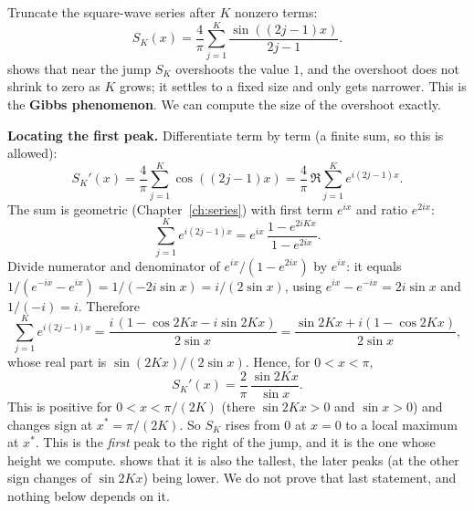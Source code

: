 Truncate the square-wave series after $K$ nonzero terms:
\begin{equation}
S_K(x)=\frac4\pi\sum_{j=1}^{K}\frac{\sin((2j-1)x)}{2j-1}.
\end{equation}
 shows that near the jump $S_K$ overshoots the value $1$, and the overshoot does not shrink to zero as $K$ grows; it settles to a fixed size and only gets narrower. This is the \textbf{Gibbs phenomenon}. We can compute the size of the overshoot exactly.

\textbf{Locating the first peak.} Differentiate term by term (a finite sum, so this is allowed):
\begin{equation}
S_K'(x)=\frac4\pi\sum_{j=1}^K\cos((2j-1)x)=\frac4\pi\,\Re\sum_{j=1}^K e^{i(2j-1)x}.
\end{equation}
The sum is geometric (Chapter~\ref{ch:series}) with first term $e^{ix}$ and ratio $e^{2ix}$:
\begin{equation}
\sum_{j=1}^K e^{i(2j-1)x}=e^{ix}\,\frac{1-e^{2iKx}}{1-e^{2ix}} .
\end{equation}
Divide numerator and denominator of $e^{ix}/(1-e^{2ix})$ by $e^{ix}$: it equals $1/(e^{-ix}-e^{ix})=1/(-2i\sin x)=i/(2\sin x)$, using $e^{ix}-e^{-ix}=2i\sin x$ and $1/(-i)=i$. Therefore
\begin{equation}
\sum_{j=1}^K e^{i(2j-1)x}=\frac{i\,(1-\cos2Kx-i\sin 2Kx)}{2\sin x}=\frac{\sin2Kx+i(1-\cos2Kx)}{2\sin x},
\end{equation}
whose real part is $\sin(2Kx)/(2\sin x)$. Hence, for $0<x<\pi$,
\begin{equation}
S_K'(x)=\frac{2}{\pi}\,\frac{\sin 2Kx}{\sin x}.
\end{equation}
This is positive for $0<x<\pi/(2K)$ (there $\sin 2Kx>0$ and $\sin x>0$) and changes sign at $x^*=\pi/(2K)$. So $S_K$ rises from $0$ at $x=0$ to a local maximum at $x^*$. This is the \emph{first} peak to the right of the jump, and it is the one whose height we compute.  shows that it is also the tallest, the later peaks (at the other sign changes of $\sin 2Kx$) being lower. We do not prove that last statement, and nothing below depends on it.

